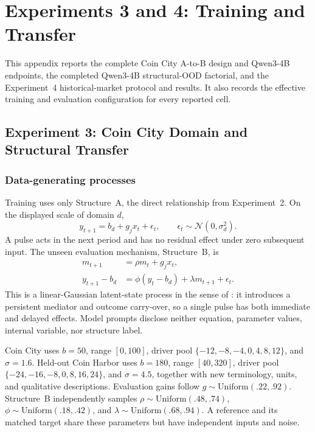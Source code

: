 
\section{Experiments 3 and 4: Training and Transfer}
\label{app:exp3}

This appendix reports the complete Coin City A-to-B design and Qwen3-4B
endpoints, the completed Qwen3-4B structural-OOD factorial, and the Experiment~4
historical-market protocol and results. It also records the effective training
and evaluation configuration for every reported cell.

\subsection{Experiment 3: Coin City Domain and Structural Transfer}
\label{app:exp3-coin-structural}

\subsubsection{Data-generating processes}

Training uses only Structure~A, the direct relationship from Experiment~2. On
the displayed scale of domain $d$,
\begin{equation}
  y_{t+1}=b_d+g_jx_t+\epsilon_t,\qquad
  \epsilon_t\sim\mathcal N(0,\sigma_d^2).
  \label{eq:exp3-coin-a}
\end{equation}
A pulse acts in the next period and has no residual effect under zero subsequent
input. The unseen evaluation mechanism, Structure~B, is
\begin{align}
  m_{t+1}&=\rho m_t+g_jx_t,\\
  y_{t+1}-b_d&=\phi(y_t-b_d)+\lambda m_{t+1}+\epsilon_t.
  \label{eq:exp3-coin-b}
\end{align}
This is a linear-Gaussian latent-state process in the sense of
\citet{kalman1960new}: it introduces a persistent mediator and outcome carry-over,
so a single pulse has both immediate and delayed effects. Model prompts disclose neither equation,
parameter values, internal variable, nor structure label.

Coin City uses $b=50$, range $[0,100]$, driver pool
$\{-12,-8,-4,0,4,8,12\}$, and $\sigma=1.6$. Held-out Coin Harbor uses
$b=180$, range $[40,320]$, driver pool
$\{-24,-16,-8,0,8,16,24\}$, and $\sigma=4.5$, together with new terminology,
units, and qualitative descriptions. Evaluation gains follow
$g\sim\mathrm{Uniform}(.22,.92)$. Structure~B independently samples
$\rho\sim\mathrm{Uniform}(.48,.74)$,
$\phi\sim\mathrm{Uniform}(.18,.42)$, and
$\lambda\sim\mathrm{Uniform}(.68,.94)$. A reference and its matched target share
these parameters but have independent inputs and noise.

